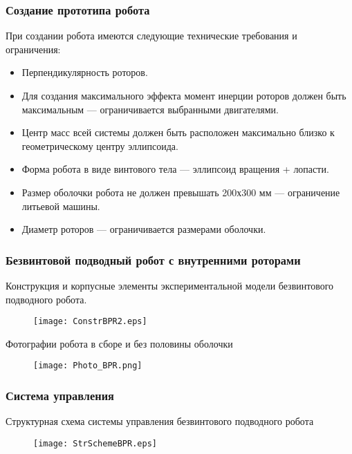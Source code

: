 \begin{frame}
\frametitle{Создание прототипа робота}

При создании робота имеются следующие технические требования и ограничения:
\begin{itemize}
	\item Перпендикулярность роторов.
	\item Для создания максимального эффекта момент инерции роторов должен быть максимальным --- ограничивается выбранными двигателями.
	\item Центр масс всей системы должен быть расположен максимально близко к геометрическому центру эллипсоида.
	\item Форма робота в виде винтового тела --- эллипсоид вращения + лопасти.
	\item Размер оболочки робота не должен превышать 200х300 мм --- ограничение литьевой машины. 
	\item Диаметр роторов --- ограничивается размерами оболочки.	
\end{itemize}



\end{frame}






\begin{frame}
\frametitle{Безвинтовой подводный робот с внутренними роторами}

Конструкция и корпусные элементы экспериментальной модели безвинтового подводного робота.
\begin{figure}[h]
	\centering
	\texttt{[image: ConstrBPR2.eps]}%
\end{figure}

Фотографии робота в сборе и без половины оболочки
\begin{figure}[h]
	\centering
	\texttt{[image: Photo\_BPR.png]}%
\end{figure}

\end{frame}


\begin{frame}
\frametitle{Система управления}
Структурная схема системы управления безвинтового подводного робота

\begin{figure}[h!]
	\begin{center}
		\texttt{[image: StrSchemeBPR.eps]}
	\end{center}
\end{figure}

\end{frame}



